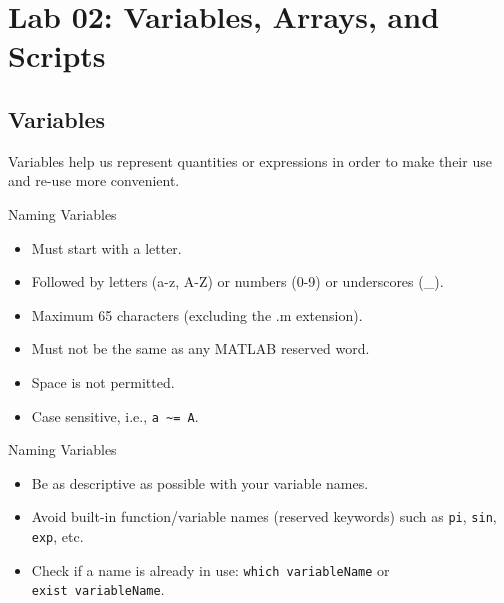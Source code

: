 \hypertarget{lab-02-variables-arrays-and-scripts}{%
\section{Lab 02: Variables, Arrays, and
Scripts}\label{lab-02-variables-arrays-and-scripts}}

\hypertarget{variables}{%
\subsection{Variables}\label{variables}}

\begin{frame}{}
\protect\hypertarget{section}{}
Variables help us represent quantities or expressions in order to make
their use and re-use more convenient.
\end{frame}

\begin{frame}[fragile]{Naming Variables}
\protect\hypertarget{naming-variables}{}
\begin{itemize}[<+->]
\tightlist
\item
  Must start with a letter.
\item
  Followed by letters (a-z, A-Z) or numbers (0-9) or underscores (\_).
\item
  Maximum 65 characters (excluding the .m extension).
\item
  Must not be the same as any MATLAB reserved word.
\item
  Space is not permitted.
\item
  Case sensitive, i.e., \texttt{a\ \textasciitilde{}=\ A}.
\end{itemize}
\end{frame}

\begin{frame}[fragile]{Naming Variables}
\protect\hypertarget{naming-variables-1}{}
\begin{itemize}[<+->]
\tightlist
\item
  Be as descriptive as possible with your variable names.
\item
  Avoid built-in function/variable names (reserved keywords) such as
  \texttt{pi}, \texttt{sin}, \texttt{exp}, etc.
\item
  Check if a name is already in use: \texttt{which\ variableName} or
  \texttt{exist\ variableName}.
\end{itemize}
\end{frame}

